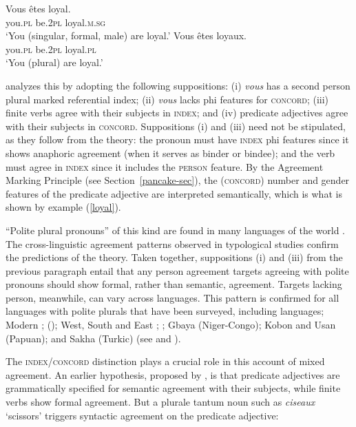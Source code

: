 \documentclass[output=paper
 	        ,biblatex
                ,babelshorthands
                ,newtxmath
                ,draftmode
                ,colorlinks, citecolor=brown
]{langscibook}
\begin{document}
\begin{exe} 
\ex\label{loyal}
\begin{xlist}
\ex
\gll   Vous		\^{e}tes		loyal. \\
		you.\textsc{pl}		be.\textsc{2pl}	loyal.\textsc{m.sg} \\
\glt		`You (singular, formal, male) are loyal.’ 
\ex 
\gll	Vous		\^{e}tes		loyaux. \\
		you.\textsc{pl}		be.\textsc{2pl}	loyal.\textsc{pl} \\
\glt		`You (plural) are loyal.’  
\end{xlist}
\end{exe}

\noindent
\citet{Wechsler:2011} analyzes this by adopting the following suppositions: (i) \textit{vous} has a  second person plural marked referential index; (ii) \textit{vous} lacks phi features for \textsc{concord}; (iii) finite verbs agree with their subjects in \textsc{index}; and (iv) predicate adjectives agree with their subjects in \textsc{concord}.  Suppositions (i) and (iii) need not be stipulated, as they follow from the theory:  the pronoun must have \textsc{index} phi features since it shows anaphoric agreement (when it serves as binder or bindee); and the verb must agree in \textsc{index} since it includes the \textsc{person} feature.  By the Agreement Marking Principle (see Section~\ref{pancake-sec}), the (\textsc{concord}) number and gender features of the predicate adjective are interpreted semantically, which is what is shown by example (\ref{loyal}). 

``Polite plural pronouns'' of this kind are found in many languages of the world \citep{Head:1978}.   The cross-linguistic agreement patterns observed in typological studies \citep{Comrie:1975,Wechsler:2011} confirm the predictions of the theory.  Taken together, suppositions (i) and (iii) from the previous paragraph entail that any person agreement targets agreeing with polite pronouns should show formal, rather than semantic, agreement.  Targets lacking person, meanwhile, can vary across languages.  This pattern is confirmed for all languages with polite plurals that have been surveyed, including  languages; Modern ;  (); West, South and East ; ; Gbaya (Niger-Congo);  Kobon and Usan (Papuan); and Sakha (Turkic) (see \citealt{Comrie:1975} and \citealt{Wechsler:2011}).   
 
The \textsc{index/concord} distinction plays a crucial role in this account of mixed agreement.  An earlier hypothesis, proposed by \citet{Kathol99b}, is that  predicate adjectives are grammatically specified for semantic  agreement with their subjects, while finite verbs show formal agreement.  But a plurale tantum noun such as \textit{ciseaux} `scissors’ triggers syntactic agreement on the predicate adjective:
	
\end{document}
